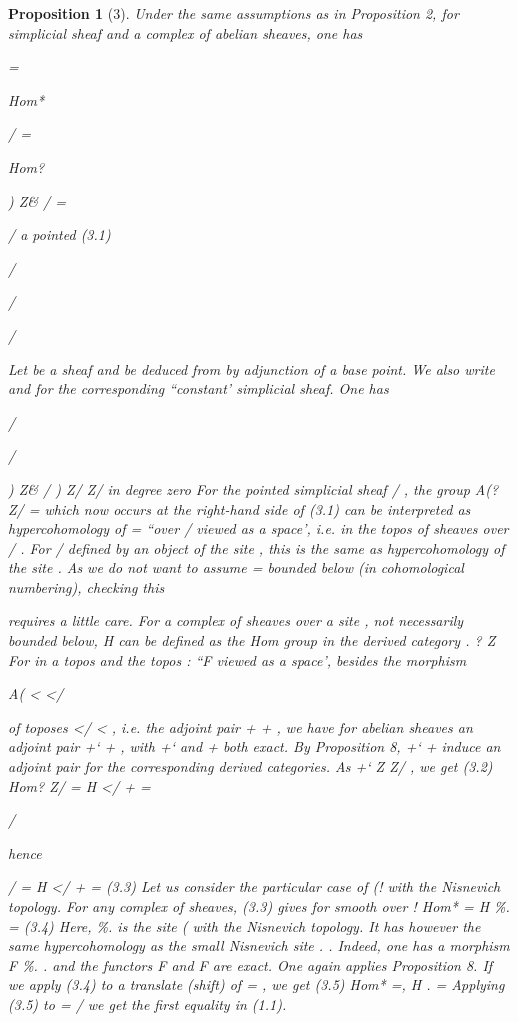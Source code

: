\documentclass[11pt,a4paper]{article}
\theoremstyle{plain}
\newtheorem{proposition}[theorem]{Proposition}
\theoremstyle{definition}
\begin{document}
\begin{proposition}[3]
Under the same assumptions as in Proposition 2, for
simplicial sheaf and a complex of abelian sheaves, one has

=

Hom*

/  =

Hom?

) Z\& /  =

/ a pointed
(3.1)


/

/


/

Let be a sheaf and
be deduced from by adjunction of a base point. We also
write and
for the corresponding ``constant' simplicial sheaf. One has

/

/

) Z\& /  ) Z/  Z/  in degree zero
For the pointed simplicial sheaf / , the group A(? Z/  = which now occurs
at the right-hand side of (3.1) can be interpreted as hypercohomology of = ``over /
viewed as a space', i.e. in the topos of sheaves over / . For / defined by an object
 of the site  , this is the same as hypercohomology of the site  . As we do
not want to assume = bounded below (in cohomological numbering), checking this

requires a little care.
For a complex of sheaves
over a site , not necessarily bounded below,
H
can be defined as the Hom group in the derived category
.
? Z
For in a topos and the topos
: ``F viewed as a space', besides the morphism



A(   
<
</

of toposes </
< , i.e. the adjoint pair +  + , we have for abelian sheaves
an adjoint pair +`  + , with +` and + both exact. By Proposition 8, +`  +  induce
an adjoint pair for the corresponding derived categories. As +` Z Z/ , we get
(3.2)
Hom? Z/  = H </ + =
 
/

hence

/  = H </ + =
(3.3)
Let us consider the particular case of (! with the Nisnevich topology. For any
complex of sheaves, (3.3) gives for  smooth over !
Hom*   = H \%.    =
(3.4)
Here, \%.   is the site ( with the Nisnevich topology. It has however
the same hypercohomology as the small Nisnevich site .   . Indeed, one has a
morphism F \%.  
.   and the functors F and F are exact. One again
applies Proposition 8. If we apply (3.4) to a translate (shift) of = , we get
(3.5)
Hom*   =, H .    =
Applying (3.5) to = /  we get the first equality in (1.1).
\end{proposition}
\end{document}
